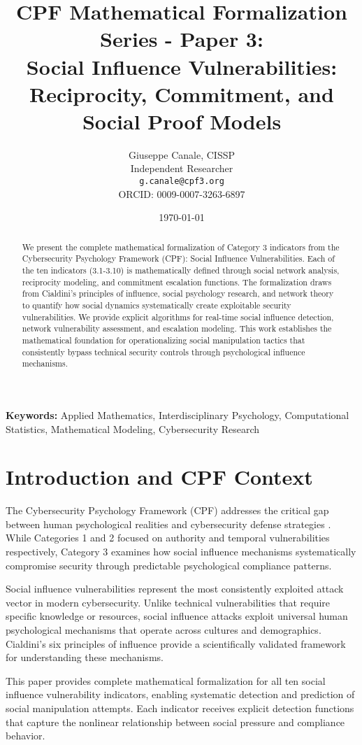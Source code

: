 \documentclass[11pt,a4paper]{article}
\title{CPF Mathematical Formalization Series - Paper 3:\\Social Influence Vulnerabilities: Reciprocity, Commitment, and Social Proof Models}
\author{
    Giuseppe Canale, CISSP\\
    Independent Researcher\\
    \texttt{g.canale@cpf3.org}\\
    ORCID: 0009-0007-3263-6897
}
\date{\today}
\begin{document}
\maketitle

\begin{abstract}
We present the complete mathematical formalization of Category 3 indicators from the Cybersecurity Psychology Framework (CPF): Social Influence Vulnerabilities. Each of the ten indicators (3.1-3.10) is mathematically defined through social network analysis, reciprocity modeling, and commitment escalation functions. The formalization draws from Cialdini's principles of influence, social psychology research, and network theory to quantify how social dynamics systematically create exploitable security vulnerabilities. We provide explicit algorithms for real-time social influence detection, network vulnerability assessment, and escalation modeling. This work establishes the mathematical foundation for operationalizing social manipulation tactics that consistently bypass technical security controls through psychological influence mechanisms.
\end{abstract}

\textbf{Keywords:} Applied Mathematics, Interdisciplinary Psychology, Computational Statistics, Mathematical Modeling, Cybersecurity Research

\section{Introduction and CPF Context}

The Cybersecurity Psychology Framework (CPF) addresses the critical gap between human psychological realities and cybersecurity defense strategies \cite{canale2024cpf}. While Categories 1 and 2 focused on authority and temporal vulnerabilities respectively, Category 3 examines how social influence mechanisms systematically compromise security through predictable psychological compliance patterns.

Social influence vulnerabilities represent the most consistently exploited attack vector in modern cybersecurity. Unlike technical vulnerabilities that require specific knowledge or resources, social influence attacks exploit universal human psychological mechanisms that operate across cultures and demographics. Cialdini's six principles of influence \cite{cialdini2007} provide a scientifically validated framework for understanding these mechanisms.

This paper provides complete mathematical formalization for all ten social influence vulnerability indicators, enabling systematic detection and prediction of social manipulation attempts. Each indicator receives explicit detection functions that capture the nonlinear relationship between social pressure and compliance behavior.
\end{document}
